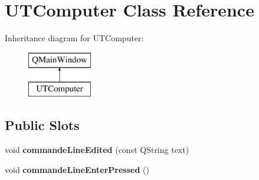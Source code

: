 \hypertarget{class_u_t_computer}{}\section{U\+T\+Computer Class Reference}
\label{class_u_t_computer}
Inheritance diagram for U\+T\+Computer\+:\begin{figure}[H]
\begin{center}
\leavevmode
\includegraphics[height=2.000000cm]{class_u_t_computer}
\end{center}
\end{figure}
\subsection*{Public Slots}
\begin{DoxyCompactItemize}
\item 
void {\bfseries commande\+Line\+Edited} (const Q\+String text)\hypertarget{class_u_t_computer_aac6e46b0a12c09c1baa6dc31e980c699}{}\label{class_u_t_computer_aac6e46b0a12c09c1baa6dc31e980c699}

\item 
void {\bfseries commande\+Line\+Enter\+Pressed} ()\hypertarget{class_u_t_computer_aa3febdac8021dc63fa60d0ec68a848d2}{}\label{class_u_t_computer_aa3febdac8021dc63fa60d0ec68a848d2}

\end{DoxyCompactItemize}
